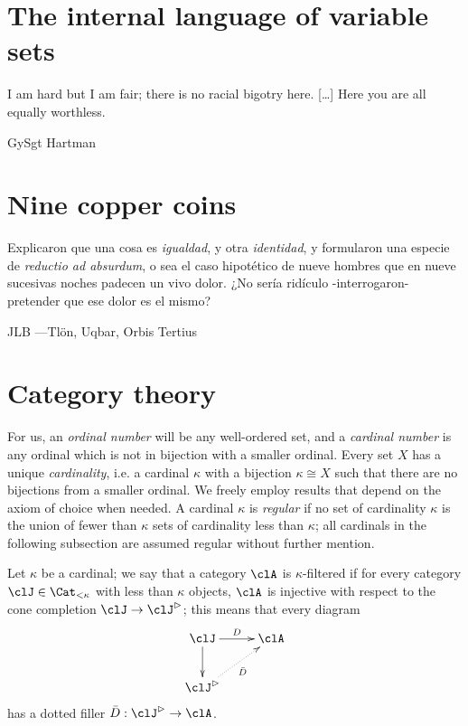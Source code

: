 \documentclass{amsart}
\begin{document}
\section{The internal language of variable sets}
\epigraph{I am hard but I am fair; there is no racial bigotry here. [\dots\unkern] Here you are all equally worthless.}{GySgt Hartman}
\section{Nine copper coins}
\epigraph{Explicaron que una cosa es \emph{igualdad}, y otra \emph{identidad}, y formularon una especie de \emph{reductio ad absurdum}, o sea el caso hipotético de nueve hombres que en nueve sucesivas noches padecen un vivo dolor. ¿No sería ridículo -interrogaron- pretender que ese dolor es el mismo?}{JLB ---Tl\"on, Uqbar, Orbis Tertius}
\appendix
\section{Category theory}
For us, an \emph{ordinal number} will be any well\hyp{}ordered set, and a \emph{cardinal number} is any ordinal which is not in bijection with a smaller ordinal. Every set $X$ has a unique \emph{cardinality}, i.e. a cardinal $\kappa$ with a bijection $\kappa \cong X$ such that there are no bijections from a smaller ordinal. We freely employ results that depend on the axiom of choice when needed. A cardinal $\kappa$ is \emph{regular} if no set of cardinality $\kappa$ is the union of fewer than $\kappa$ sets of cardinality less than $\kappa$; all cardinals in the following subsection are assumed regular without further mention.

Let $\kappa$ be a cardinal; we say that a category $\clA$ is $\kappa$\hyp{}filtered if for every category $\clJ\in\Cat_{<\kappa}$ with less than $\kappa$ objects, $\clA$ is injective with respect to the cone completion $\clJ\to \clJ^\rhd$; this means that every diagram
\[
	\vcenter{\xymatrix{
			\clJ\ar[d]\ar[r]^D & \clA \\
			\clJ^\rhd\ar@{.>}[ur]_{\bar D}
		}}
\]
has a dotted filler $\bar D : \clJ^\rhd \to \clA$.
\end{document}
